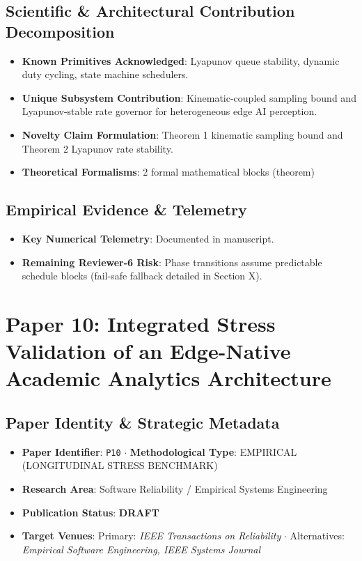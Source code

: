\documentclass[11pt,a4paper]{article}
\begin{document}
\subsection*{Scientific & Architectural Contribution Decomposition}
\begin{itemize}[leftmargin=1.5em, itemsep=0.2em]
    \item \textbf{Known Primitives Acknowledged}: Lyapunov queue stability, dynamic duty cycling, state machine schedulers.
    \item \textbf{Unique Subsystem Contribution}: Kinematic-coupled sampling bound and Lyapunov-stable rate governor for heterogeneous edge AI perception.
    \item \textbf{Novelty Claim Formulation}: Theorem 1 kinematic sampling bound and Theorem 2 Lyapunov rate stability.
    \item \textbf{Theoretical Formalisms}: 2 formal mathematical blocks (theorem)
\end{itemize}

\subsection*{Empirical Evidence & Telemetry}
\begin{itemize}[leftmargin=1.5em, itemsep=0.2em]
    \item \textbf{Key Numerical Telemetry}: Documented in manuscript.
    \item \textbf{Remaining Reviewer-6 Risk}: Phase transitions assume predictable schedule blocks (fail-safe fallback detailed in Section X).
\end{itemize}

\section{Paper 10: Integrated Stress Validation of an Edge-Native Academic Analytics Architecture}

\subsection*{Paper Identity \& Strategic Metadata}
\begin{itemize}[leftmargin=1.5em, itemsep=0.2em]
    \item \textbf{Paper Identifier}: \texttt{P10} $\cdot$ \textbf{Methodological Type}: EMPIRICAL (LONGITUDINAL STRESS BENCHMARK)
    \item \textbf{Research Area}: Software Reliability / Empirical Systems Engineering
    \item \textbf{Publication Status}: \textbf{DRAFT}
    \item \textbf{Target Venues}: Primary: \textit{IEEE Transactions on Reliability} $\cdot$ Alternatives: \textit{Empirical Software Engineering, IEEE Systems Journal}
\end{itemize}
\end{document}
